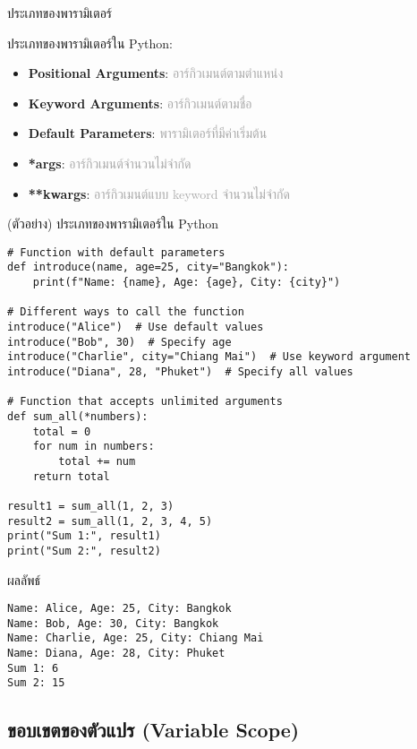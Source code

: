 \documentclass[12pt,a4paper]{article}
\newcommand{\textlight}[1]{{\thailightfont #1}}
\begin{document}
\begin{noticebox}{ประเภทของพารามิเตอร์}

\textlight{ประเภทของพารามิเตอร์ใน Python:}

\begin{itemize}
    \item \textbf{Positional Arguments}: \textcolor{darkgray}{อาร์กิวเมนต์ตามตำแหน่ง}
    \item \textbf{Keyword Arguments}: \textcolor{darkgray}{อาร์กิวเมนต์ตามชื่อ}
    \item \textbf{Default Parameters}: \textcolor{darkgray}{พารามิเตอร์ที่มีค่าเริ่มต้น}
    \item \textbf{*args}: \textcolor{darkgray}{อาร์กิวเมนต์จำนวนไม่จำกัด}
    \item \textbf{**kwargs}: \textcolor{darkgray}{อาร์กิวเมนต์แบบ keyword จำนวนไม่จำกัด}
\end{itemize}

\end{noticebox}

\begin{codebox}{(ตัวอย่าง) ประเภทของพารามิเตอร์ใน Python}
\begin{lstlisting}[style=python]
# Function with default parameters
def introduce(name, age=25, city="Bangkok"):
    print(f"Name: {name}, Age: {age}, City: {city}")

# Different ways to call the function
introduce("Alice")  # Use default values
introduce("Bob", 30)  # Specify age
introduce("Charlie", city="Chiang Mai")  # Use keyword argument
introduce("Diana", 28, "Phuket")  # Specify all values

# Function that accepts unlimited arguments
def sum_all(*numbers):
    total = 0
    for num in numbers:
        total += num
    return total

result1 = sum_all(1, 2, 3)
result2 = sum_all(1, 2, 3, 4, 5)
print("Sum 1:", result1)
print("Sum 2:", result2)
\end{lstlisting}
\end{codebox}

\begin{resultbox}{ผลลัพธ์}
\begin{verbatim}
Name: Alice, Age: 25, City: Bangkok
Name: Bob, Age: 30, City: Bangkok
Name: Charlie, Age: 25, City: Chiang Mai
Name: Diana, Age: 28, City: Phuket
Sum 1: 6
Sum 2: 15
\end{verbatim}
\end{resultbox}

\subsection{ขอบเขตของตัวแปร (Variable Scope)}
\end{document}
